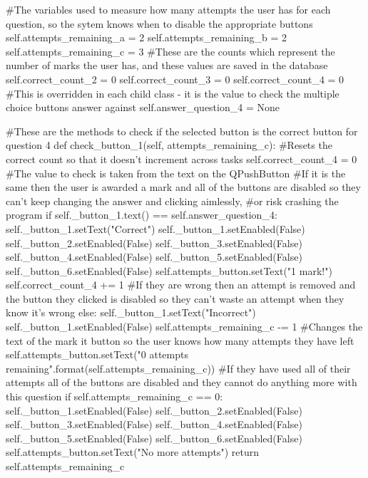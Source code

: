 \begin{landscape}
\begin{python}
        #The variables used to measure how many attempts the user has for each question, so the sytem knows when to disable the appropriate buttons
        self.attempts_remaining_a = 2
        self.attempts_remaining_b = 2
        self.attempts_remaining_c = 3
        #These are the counts which represent the number of marks the user has, and these values are saved in the database
        self.correct_count_2 = 0
        self.correct_count_3 = 0
        self.correct_count_4 = 0
        #This is overridden in each child class - it is the value to check the multiple choice buttons answer against
        self.answer_question_4 = None

    #These are the methods to check if the selected button is the correct button for question 4
    def check_button_1(self, attempts_remaining_c):
        #Resets the correct count so that it doesn't increment across tasks
        self.correct_count_4 = 0
        #The value to check is taken from the text on the QPushButton
        #If it is the same then the user is awarded a mark and all of the buttons are disabled so they can't keep changing the answer and clicking aimlessly,
        #or risk crashing the program
        if self._button_1.text() == self.answer_question_4:
            self._button_1.setText("Correct")
            self._button_1.setEnabled(False)
            self._button_2.setEnabled(False)
            self._button_3.setEnabled(False)
            self._button_4.setEnabled(False)
            self._button_5.setEnabled(False)
            self._button_6.setEnabled(False)
            self.attempts_button.setText("1 mark!")
            self.correct_count_4 += 1
        #If they are wrong then an attempt is removed and the button they clicked is disabled so they can't waste an attempt when they know it's wrong
        else:
            self._button_1.setText("Incorrect")
            self._button_1.setEnabled(False)
            self.attempts_remaining_c -= 1
            #Changes the text of the mark it button so the user knows how many attempts they have left
            self.attempts_button.setText("{0} attempts remaining".format(self.attempts_remaining_c))
            #If they have used all of their attempts all of the buttons are disabled and they cannot do anything more with this question
            if self.attempts_remaining_c == 0:
                self._button_1.setEnabled(False)
                self._button_2.setEnabled(False)
                self._button_3.setEnabled(False)
                self._button_4.setEnabled(False)
                self._button_5.setEnabled(False)
                self._button_6.setEnabled(False)
                self.attempts_button.setText("No more attempts")
            return self.attempts_remaining_c


\end{python}
\end{landscape}
